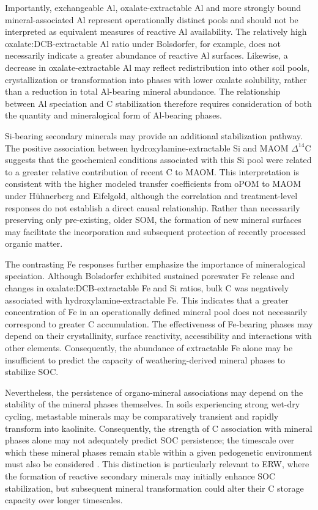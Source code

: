 \documentclass[preprint,12pt]{elsarticle}
\begin{document}
Importantly, exchangeable Al, oxalate-extractable Al and more strongly bound mineral-associated Al represent operationally distinct pools and should not be interpreted as equivalent measures of reactive Al availability. The relatively high oxalate:DCB-extractable Al ratio under Bolsdorfer, for example, does not necessarily indicate a greater abundance of reactive Al surfaces. Likewise, a decrease in oxalate-extractable Al may reflect redistribution into other soil pools, crystallization or transformation into phases with lower oxalate solubility, rather than a reduction in total Al-bearing mineral abundance. The relationship between Al speciation and C stabilization therefore requires consideration of both the quantity and mineralogical form of Al-bearing phases.

Si-bearing secondary minerals may provide an additional stabilization pathway. The positive association between hydroxylamine-extractable Si and MAOM $\Delta^{14}$C suggests that the geochemical conditions associated with this Si pool were related to a greater relative contribution of recent C to MAOM. This interpretation is consistent with the higher modeled transfer coefficients from oPOM to MAOM under Hühnerberg and Eifelgold, although the correlation and treatment-level responses do not establish a direct causal relationship. Rather than necessarily preserving only pre-existing, older SOM, the formation of new mineral surfaces may facilitate the incorporation and subsequent protection of recently processed organic matter.

The contrasting Fe responses further emphasize the importance of mineralogical speciation. Although Bolsdorfer exhibited sustained porewater Fe release and changes in oxalate:DCB-extractable Fe and Si ratios, bulk C was negatively associated with hydroxylamine-extractable Fe. This indicates that a greater concentration of Fe in an operationally defined mineral pool does not necessarily correspond to greater C accumulation. The effectiveness of Fe-bearing phases may depend on their crystallinity, surface reactivity, accessibility and interactions with other elements. Consequently, the abundance of extractable Fe alone may be insufficient to predict the capacity of weathering-derived mineral phases to stabilize SOC.

Nevertheless, the persistence of organo-mineral associations may depend on the stability of the mineral phases themselves. In soils experiencing strong wet-dry cycling, metastable minerals may be comparatively transient and rapidly transform into kaolinite. Consequently, the strength of C association with mineral phases alone may not adequately predict SOC persistence; the timescale over which these mineral phases remain stable within a given pedogenetic environment must also be considered \citep{khomo2017timescales}. This distinction is particularly relevant to ERW, where the formation of reactive secondary minerals may initially enhance SOC stabilization, but subsequent mineral transformation could alter their C storage capacity over longer timescales.
\end{document}
